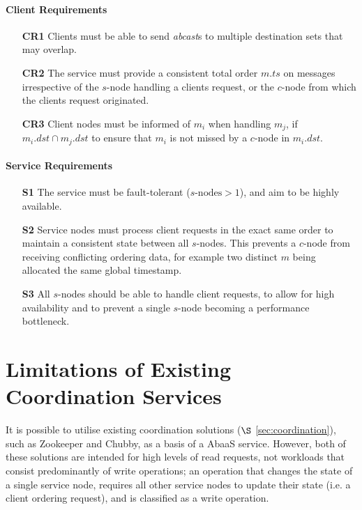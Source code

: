 	\paragraph{Client Requirements} \hspace{0pt}
	\begin{itemize}
		\item [\textbf{CR1}] Clients must be able to send \emph{abcast}s to multiple destination sets that may overlap.
		
		\item [\textbf{CR2}] The service must provide a consistent total order $m.ts$ on messages irrespective of the $s$-node handling a clients request, or the $c$-node from which the clients request originated.  
		
		\item [\textbf{CR3}] Client nodes must be informed of $m_i$ when handling $m_j$, if $m_i.dst \cap m_j.dst$ to ensure that $m_i$ is not missed by a $c$-node in $m_i.dst$.  
	\end{itemize}
	
	\paragraph{Service Requirements} \hspace{0pt}
	\begin{itemize}
		\item [\textbf{S1}] The service must be fault-tolerant ($s\text{-nodes} > 1$), and aim to be highly available.  
		
		\item [\textbf{S2}] Service nodes must process client requests in the exact same order to maintain a consistent state between all $s$-nodes.  This prevents a $c$-node from receiving conflicting ordering data, for example two distinct $m$ being allocated the same global timestamp.  
		
		\item [\textbf{S3}] All $s$-nodes should be able to handle client requests, to allow for high availability and to prevent a single $s$-node becoming a performance bottleneck.
	\end{itemize}

\section{Limitations of Existing Coordination Services}\label{sec:limitations_existing_coordination}
It is possible to utilise existing coordination solutions ($\S$ \ref{sec:coordination}), such as Zookeeper\citep{Hunt:2010:ZWC:1855840.1855851} and Chubby\citep{Burrows:2006:CLS:1298455.1298487}, as a basis of a \textsf{AbaaS} service.  However, both of these solutions are intended for high levels of read requests, not workloads that consist predominantly of write operations; an operation that changes the state of a single service node, requires all other service nodes to update their state (i.e. a client ordering request), and is classified as a write operation.  

